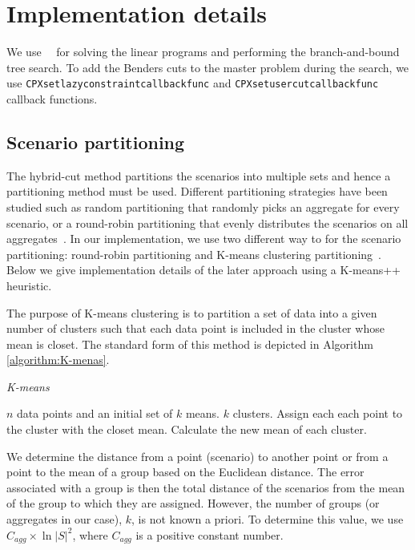 \section{Implementation details}
\label{sec:Implementation details}



We use \Cplex~\cite{IBMILogCplex}~for solving the linear programs and performing the branch-and-bound tree search. To add the Benders cuts to the master problem during the search, we use {\tt CPXsetlazyconstraintcallbackfunc} and {\tt CPXsetusercutcallbackfunc} callback functions.

\subsection{Scenario partitioning}
\label{subsec:Scenario partitioning}

The hybrid-cut method partitions the scenarios into multiple sets and hence a partitioning method must be used. Different partitioning strategies have been studied such as random partitioning that randomly picks an aggregate for every scenario, or a round-robin partitioning that evenly distributes the scenarios on all aggregates~\cite{Wolf2013Advancedaccelerationtechniques}. In our implementation, we use two different way to for the scenario partitioning: round-robin partitioning and K-means clustering partitioning~\cite{Hartigan.Wong1979AlgorithmAS136:}. Below we give implementation details of the later approach using a K-means++ heuristic.

The purpose of K-means clustering is to partition a set of data into a given number of clusters such that each data point is included in the cluster whose mean is closet. The standard form of this method is depicted in Algorithm \ref{algorithm:K-menas}.

\begin{algorithm}[ht!]
\caption{\textit{K-means}}
\label{algorithm:K-menas}
\begin{algorithmic}[1]
    \REQUIRE $n$ data points and an initial set of $k$ means.
    \ENSURE $k$ clusters.
        \STATE Assign each each point to the cluster with the closet mean.
        \STATE Calculate the new mean of each cluster.
    \ENDWHILE
\end{algorithmic}
\end{algorithm}

We determine the distance from a point (scenario) to another point or from a point to the mean of a group based on the Euclidean distance. The error associated with a group is then the total distance of the scenarios from the mean of the group to which they are assigned. However, the number of groups (or aggregates in our case), $k$, is not known a priori. To determine this value, we use
$C_{agg} \times \ln{| S |}^2$, where $C_{agg}$ is a positive constant number.

